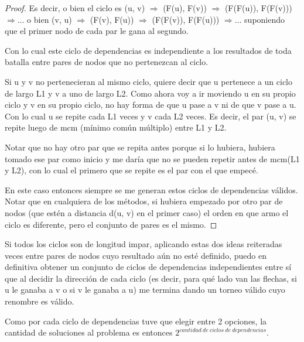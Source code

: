 \begin{proof}
	Es decir, o bien el ciclo es (u, v) $\Rightarrow$ (F(u), F(v)) $\Rightarrow$ (F(F(u)), F(F(v))) $\Rightarrow \ldots$ o bien (v, u) $\Rightarrow$ (F(v), F(u)) $\Rightarrow$ (F(F(v)), F(F(u))) $\Rightarrow \ldots$ suponiendo que el primer nodo de cada par le gana al segundo. \newline

	Con lo cual este ciclo de dependencias es independiente a los resultados de toda batalla entre pares de nodos que no pertenezcan al ciclo. \newline 

	Si u y v no pertenecieran al mismo ciclo, quiere decir que u pertenece a un ciclo de largo L1 y v a uno de largo L2. Como ahora voy a ir moviendo u en su propio ciclo y v en su propio ciclo, no hay forma de que u pase a v ni de que v pase a u. Con lo cual u se repite cada L1 veces y v cada L2 veces. Es decir, el par (u, v) se repite luego de mcm (mínimo común múltiplo) entre L1 y L2. \newline

	Notar que no hay otro par que se repita antes porque si lo hubiera, hubiera tomado ese par como inicio y me daría que no se pueden repetir antes de mcm(L1 y L2), con lo cual el primero que se repite es el par con el que empecé. \newline

	En este caso entonces siempre se me generan estos ciclos de dependencias válidos. Notar que en cualquiera de los métodos, si hubiera empezado por otro par de nodos (que estén a distancia d(u, v) en el primer caso) el orden en que armo el ciclo es diferente, pero el conjunto de pares es el mismo.

\end{proof}

\begin{corollary}
	Si todos los ciclos son de longitud impar, aplicando estas dos ideas reiteradas veces entre pares de nodos cuyo resultado aún no esté definido, puedo en definitiva obtener un conjunto de ciclos de dependencias independientes entre sí que al decidir la dirección de cada ciclo (es decir, para qué lado van las flechas, si u le ganaba a v o si v le ganaba a u) me termina dando un torneo válido cuyo renombre es válido. \newline

	Como por cada ciclo de dependencias tuve que elegir entre 2 opciones, la cantidad de soluciones al problema es entonces $2^{cantidad\ de\ ciclos\ de\ dependencias}$.
\end{corollary}


